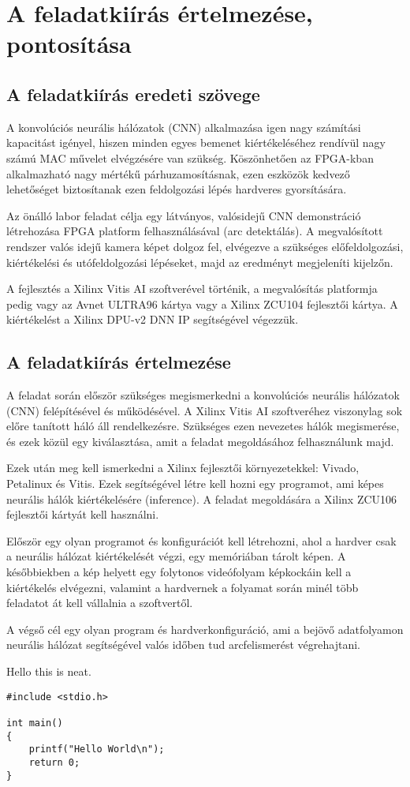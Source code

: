 \chapter{A feladatkiírás értelmezése, pontosítása}

\section{A feladatkiírás eredeti szövege}

A konvolúciós neurális hálózatok (CNN) alkalmazása igen nagy számítási kapacitást igényel, hiszen minden egyes bemenet kiértékeléséhez rendívül nagy számú MAC művelet elvégzésére van szükség. Köszönhetően az FPGA-kban alkalmazható nagy mértékű párhuzamosításnak, ezen eszközök kedvező lehetőséget biztosítanak ezen feldolgozási lépés hardveres gyorsítására.

Az önálló labor feladat célja egy látványos, valósidejű CNN demonstráció létrehozása FPGA platform felhasználásával (arc detektálás). A megvalósított rendszer valós idejű kamera képet dolgoz fel, elvégezve a szükséges előfeldolgozási, kiértékelési és utófeldolgozási lépéseket, majd az eredményt megjeleníti kijelzőn.

A fejlesztés a Xilinx Vitis AI szoftverével történik, a megvalósítás platformja pedig vagy az Avnet ULTRA96 kártya vagy a Xilinx ZCU104 fejlesztői kártya. A kiértékelést a Xilinx DPU-v2 DNN IP segítségével végezzük.

\section{A feladatkiírás értelmezése}

A feladat során először szükséges megismerkedni a konvolúciós neurális hálózatok (CNN) felépítésével és működésével. A Xilinx Vitis AI szoftveréhez viszonylag sok előre tanított háló áll rendelkezésre. Szükséges ezen nevezetes hálók megismerése, és ezek közül egy kiválasztása, amit a feladat megoldásához felhasználunk majd.

Ezek után meg kell ismerkedni a Xilinx fejlesztői környezetekkel: Vivado, Petalinux és Vitis. Ezek segítségével létre kell hozni egy programot, ami képes neurális hálók kiértékelésére (inference). A feladat megoldására a Xilinx ZCU106 fejlesztői kártyát kell használni.

Először egy olyan programot és konfigurációt kell létrehozni, ahol a hardver csak a neurális hálózat kiértékelését végzi, egy memóriában tárolt képen. A későbbiekben a kép helyett egy folytonos videófolyam képkockáin kell a kiértékelés elvégezni, valamint a hardvernek a folyamat során minél több feladatot át kell vállalnia a szoftvertől.

A végső cél egy olyan program és hardverkonfiguráció, ami a bejövő adatfolyamon neurális hálózat segítségével valós időben tud arcfelismerést végrehajtani.

Hello this  is neat.

\begin{lstlisting}
#include <stdio.h>

int main()
{
    printf("Hello World\n");
    return 0;
}

\end{lstlisting}